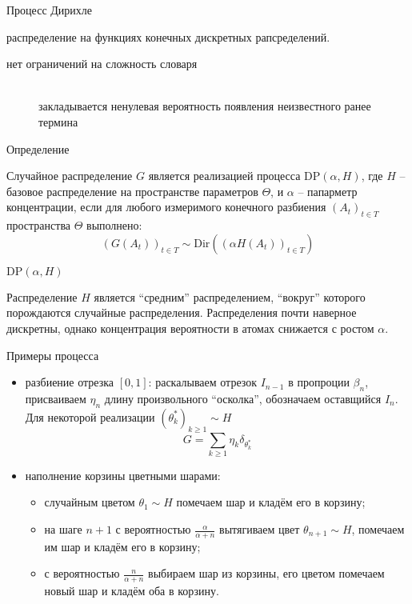 \documentclass{beamer}
\newcommand{\clo}[1]{\left [ #1 \right ]}
\newcommand{\brac}[1]{\left ( #1 \right )}
\begin{document}
\begin{frame}{Процесс Дирихле}
  \begin{block}

    распределение на функциях конечных дискретных рапсределений.
    \begin{description}
      \item[нет ограничений на сложность словаря]\hfill\\
        закладывается ненулевая вероятность появления неизвестного ранее термина
    \end{description}
  \end{block}
  \begin{block}{Определение}

    Случайное распределение $G$ является реализацией процесса $\text{DP}\brac{\alpha,H}$, где $H$ -- базовое распределение на пространстве параметров $\Theta$, и $\alpha$ -- папарметр концентрации, если для любого измеримого конечного разбиения $\brac{A_t}_{t\in T}$ пространства $\Theta$ выполнено:
    \[\brac{G(A_t)}_{t\in T}\sim \text{Dir}\brac{ \brac{\alpha H(A_t)}_{t\in T} }\] 

  \end{block}
\end{frame}

\begin{frame}{$\text{DP}\brac{\alpha,H}$}
  \begin{block}

    Распределение $H$ является ``средним'' распределением, ``вокруг'' которого порождаются случайные распределения.
    Распределения почти наверное дискретны, однако концентрация вероятности в атомах снижается с ростом $\alpha$.
  \end{block}
\end{frame}

\begin{frame}
  \begin{block}{Примеры процесса}

    \begin{itemize}
      \item разбиение отрезка $\clo{0,1}$: раскалываем отрезок $I_{n-1}$ в пропроции $\beta_n$, присваиваем $\eta_n$ длину произвольного ``осколка'', обозначаем оставщийся $I_n$. Для некоторой реализации $\brac{\theta_k^*}_{k\geq 1}\sim H$ \[G = \sum_{k\geq1} \eta_k \delta_{\theta_k^*}\]
      \item наполнение корзины цветными шарами: \begin{itemize}
        \item случайным цветом $\theta_1\sim H$ помечаем шар и кладём его в корзину;
        \item на шаге $n+1$ с вероятностью $\frac{\alpha}{\alpha+n}$ вытягиваем цвет $\theta_{n+1}\sim H$, помечаем им шар и кладём его в корзину;
        \item с вероятностью $\frac{n}{\alpha+n}$ выбираем шар из корзины, его цветом помечаем новый шар и кладём оба в корзину.
      \end{itemize} 
    \end{itemize}
  \end{block}
\end{frame}
\end{document}
